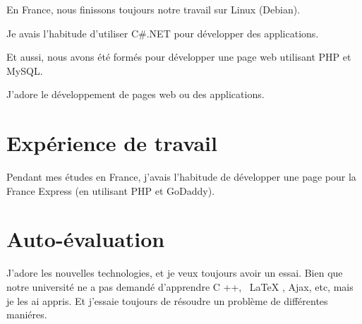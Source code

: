 \documentclass[UTF8]{ctexart}
\begin{document}
En France, nous finissons toujours notre travail sur Linux (Debian).

Je avais l'habitude d'utiliser C\#{}.NET pour d\'evelopper des applications.

Et aussi, nous avons \'et\'e form\'es pour d\'evelopper une page web utilisant PHP et MySQL.

J'adore le d\'eveloppement de pages web ou des applications.
\section{Exp\'erience de travail}
Pendant mes \'etudes en France, j'avais l'habitude de d\'evelopper une page pour la France Express (en utilisant PHP et GoDaddy).
\section{Auto-\'evaluation}
J'adore les nouvelles technologies, et je veux toujours avoir un essai. Bien que notre universit\'e ne a pas demand\'e d'apprendre C ++, \ LaTeX {}, Ajax, etc, mais je les ai appris. Et j'essaie toujours de r\'esoudre un probl\`eme de diff\'erentes mani\'eres.
\end{document}
